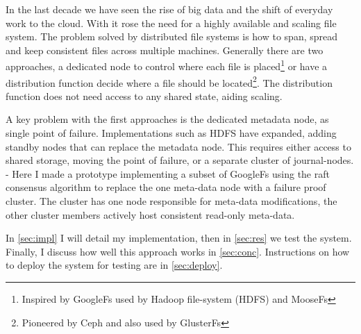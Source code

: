 In the last decade we have seen the rise of big data and the shift of everyday work to the cloud. With it rose the need for a highly available and scaling file system. The problem solved by distributed file systems is how to span, spread and keep consistent files across multiple machines. Generally there are two approaches, a dedicated node to control where each file is placed\footnote{Inspired by GoogleFs\cite{gfs} used by Hadoop file-system\cite{hdfs} (HDFS) and MooseFs\cite{moosefs}} or have a distribution function decide where a file should be located\footnote{Pioneered by Ceph\cite{ceph} and also used by GlusterFs\cite{glusterfs}}. The distribution function does not need access to any shared state, aiding scaling.

A key problem with the first approaches is the dedicated metadata node, as single point of failure. Implementations such as HDFS have expanded, adding standby nodes that can replace the metadata node. This requires either access to shared storage\cite{hdfs_ha_nfs}, moving the point of failure, or a separate cluster of journal-nodes\cite{hdfs_ha_q}.
-
Here I made a prototype implementing a subset of GoogleFs using the raft\cite{raft} consensus algorithm to replace the one meta-data node with a failure proof cluster. The cluster has one node responsible for meta-data modifications, the other cluster members actively host consistent read-only meta-data. 

In \cref{sec:impl} I will detail my implementation, then in \cref{sec:res} we test the system. Finally, I discuss how well this approach works in \cref{sec:conc}. Instructions on how to deploy the system for testing are in \cref{sec:deploy}.
